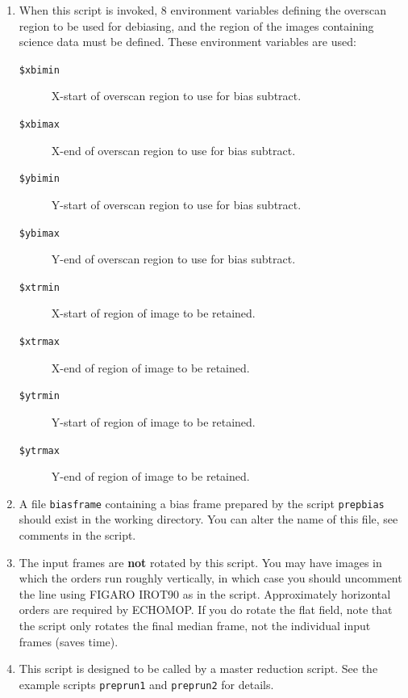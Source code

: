 \documentclass[twoside,11pt]{article}
\newcommand{\htmlref}[2]{#1}
\newcommand{\xref}[3]{#1}
\renewcommand{\_}{\texttt{\symbol{95}}}
\begin{document}
\begin{description}
\begin{enumerate}
\item When this script is invoked, 8 environment variables defining
      the overscan region to be used for debiasing, and the region
      of the images containing science data must be defined.
      These environment variables are used:

\begin{description}

\item [{\tt{\$xbimin}}]
           X-start of overscan region to use for bias subtract.

\item [{\tt{\$xbimax}}]
           X-end of overscan region to use for bias subtract.

\item [{\tt{\$ybimin}}]
           Y-start of overscan region to use for bias subtract.

\item [{\tt{\$ybimax}}]
           Y-end of overscan region to use for bias subtract.

\item [{\tt{\$xtrmin}}]
           X-start of region of image to be retained.

\item [{\tt{\$xtrmax}}]
           X-end of region of image to be retained.

\item [{\tt{\$ytrmin}}]
           Y-start of region of image to be retained.

\item [{\tt{\$ytrmax}}]
           Y-end of region of image to be retained.


\end{description}

\item A file \verb+biasframe+ containing a bias frame prepared by the
      script \htmlref{\texttt{prepbias}}{se_prepbias} should exist in the
      working directory.
      You can alter the name of this file, see comments in the
      script.

\item The input frames are {\bf not} rotated by this script.  You may
      have images in which the orders run roughly vertically,
      in which case you should uncomment the line using FIGARO
      \xref{IROT90}{sun86}{IROT90} as in the script.  Approximately
      horizontal orders
      are required by ECHOMOP.  If you do rotate the flat field,
      note that the script only rotates the final median frame,
      not the individual input frames (saves time).

\item This script is designed to be called by a master reduction
      script.  See the example scripts \htmlref{\texttt{preprun1}}
      {se_preprun}
      and \htmlref{\texttt{preprun2}}{se_preprun} for details.

\end{enumerate}
\end{description}
\end{document}
